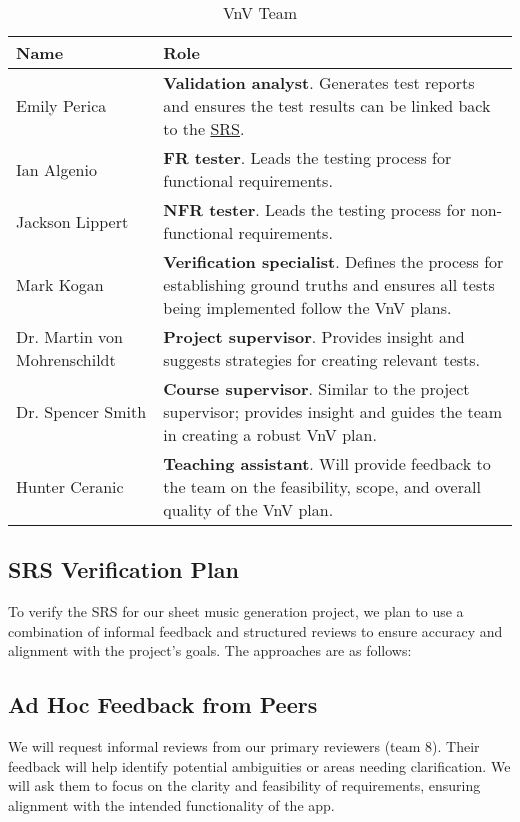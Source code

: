 \documentclass[12pt, titlepage]{article}
\begin{document}
\begin{table}[h!]
  \centering
  \caption{VnV Team}
  \begin{tabular}{|p{}|p{}|}
  \hline
    \textbf{Name} & \textbf{Role} \\
  \hline
    Emily Perica & \textbf{Validation analyst}. Generates test reports and ensures the test results can be 
    linked back to the \href{https://github.com/emilyperica/ScoreGen/blob/main/docs/SRS-Volere/SRS.pdf}{SRS}.\\
  \hline
    Ian Algenio & \textbf{FR tester}. Leads the testing process for functional requirements. \\
  \hline
    Jackson Lippert & \textbf{NFR tester}. Leads the testing process for non-functional requirements. \\
  \hline
    Mark Kogan & \textbf{Verification specialist}. Defines the process for establishing ground truths and 
    ensures all tests being implemented follow the VnV plans. \\
  \hline
    Dr. Martin von \newline Mohrenschildt & \textbf{Project supervisor}. Provides insight and suggests 
    strategies for creating relevant tests. \\
  \hline
    Dr. Spencer Smith & \textbf{Course supervisor}. Similar to the project supervisor; provides insight and 
    guides the team in creating a robust VnV plan.\\
  \hline
    Hunter Ceranic & \textbf{Teaching assistant}. Will provide feedback to the team on the feasibility, scope, 
    and overall quality of the VnV plan.\\
  \hline
  \end{tabular}
\end{table}

\subsection{SRS Verification Plan}
\label{sec:srs_verification}

To verify the SRS for our sheet music generation project, we plan to use a combination of informal feedback and structured reviews to ensure accuracy and alignment with the project's goals. The approaches are as follows:

\subsection*{Ad Hoc Feedback from Peers}
We will request informal reviews from our primary reviewers (team 8). Their feedback will help identify potential ambiguities or areas needing clarification. We will ask them to focus on the clarity and feasibility of requirements, ensuring alignment with the intended functionality of the app.
\end{document}
